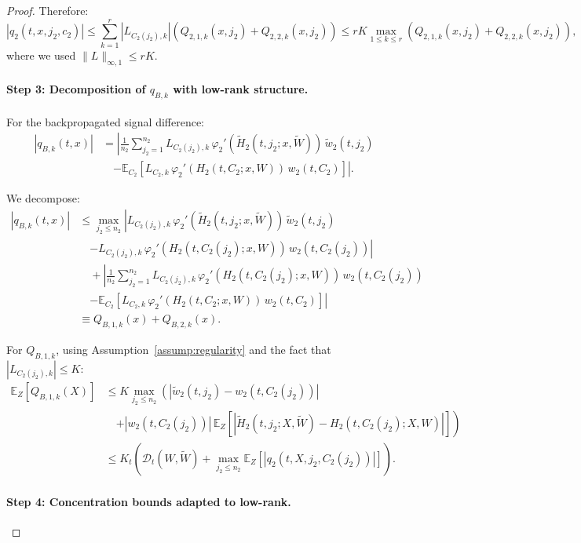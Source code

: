 \begin{proof}
Therefore:
\[
|q_2(t, x, j_2, c_2)| \le \sum_{k=1}^r |L_{C_2(j_2),k}|(Q_{2,1,k}(x, j_2) + Q_{2,2,k}(x, j_2)) \le rK\max_{1 \le k \le r}(Q_{2,1,k}(x, j_2) + Q_{2,2,k}(x, j_2)),
\]
where we used $\|L\|_{\infty,1} \le rK$.

\paragraph*{Step 3: Decomposition of $q_{B,k}$ with low-rank structure.}

For the backpropagated signal difference:
\begin{align*}
|q_{B,k}(t, x)| &= \left|\frac{1}{n_2}\sum_{j_2=1}^{n_2} L_{C_2(j_2),k}\,\varphi_2'(\tilde{H}_2(t, j_2; x, \tilde{W}))\,\tilde{w}_2(t, j_2)\right.\\
&\quad\left. - \mathbb{E}_{C_2}[L_{C_2,k}\,\varphi_2'(H_2(t, C_2; x, W))\,w_2(t, C_2)]\right|.
\end{align*}

We decompose:
\begin{align*}
|q_{B,k}(t, x)| &\le \max_{j_2 \le n_2}\left|L_{C_2(j_2),k}\,\varphi_2'(\tilde{H}_2(t, j_2; x, \tilde{W}))\,\tilde{w}_2(t, j_2)\right.\\
&\quad\left. - L_{C_2(j_2),k}\,\varphi_2'(H_2(t, C_2(j_2); x, W))\,w_2(t, C_2(j_2))\right|\\
&\quad + \left|\frac{1}{n_2}\sum_{j_2=1}^{n_2} L_{C_2(j_2),k}\,\varphi_2'(H_2(t, C_2(j_2); x, W))\,w_2(t, C_2(j_2))\right.\\
&\quad\left. - \mathbb{E}_{C_2}[L_{C_2,k}\,\varphi_2'(H_2(t, C_2; x, W))\,w_2(t, C_2)]\right|\\
&\equiv Q_{B,1,k}(x) + Q_{B,2,k}(x).
\end{align*}

For $Q_{B,1,k}$, using Assumption~\ref{assump:regularity} and the fact that $|L_{C_2(j_2),k}| \le K$:
\begin{align*}
\mathbb{E}_Z[Q_{B,1,k}(X)] &\le K\max_{j_2 \le n_2}\left(|\tilde{w}_2(t, j_2) - w_2(t, C_2(j_2))|\right.\\
&\quad\left. + |w_2(t, C_2(j_2))|\,\mathbb{E}_Z[|\tilde{H}_2(t, j_2; X, \tilde{W}) - H_2(t, C_2(j_2); X, W)|]\right)\\
&\le K_t\left(\mathscr{D}_t(W, \tilde{W}) + \max_{j_2 \le n_2}\mathbb{E}_Z[|q_2(t, X, j_2, C_2(j_2))|]\right).
\end{align*}

\paragraph*{Step 4: Concentration bounds adapted to low-rank.}


\end{proof}
